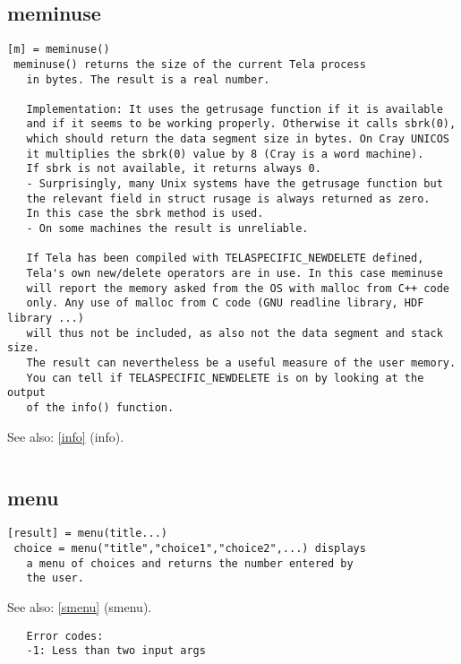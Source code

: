 \documentclass[a4paper]{article}
\begin{document}
\subsection{meminuse\label{meminuse}}

\begin{tscreen}
\begin{verbatim}
[m] = meminuse()
 meminuse() returns the size of the current Tela process
   in bytes. The result is a real number.

   Implementation: It uses the getrusage function if it is available
   and if it seems to be working properly. Otherwise it calls sbrk(0),
   which should return the data segment size in bytes. On Cray UNICOS
   it multiplies the sbrk(0) value by 8 (Cray is a word machine).
   If sbrk is not available, it returns always 0.
   - Surprisingly, many Unix systems have the getrusage function but
   the relevant field in struct rusage is always returned as zero.
   In this case the sbrk method is used.
   - On some machines the result is unreliable.

   If Tela has been compiled with TELASPECIFIC_NEWDELETE defined,
   Tela's own new/delete operators are in use. In this case meminuse
   will report the memory asked from the OS with malloc from C++ code
   only. Any use of malloc from C code (GNU readline library, HDF library ...)
   will thus not be included, as also not the data segment and stack size.
   The result can nevertheless be a useful measure of the user memory.
   You can tell if TELASPECIFIC_NEWDELETE is on by looking at the output
   of the info() function.
\end{verbatim}

See also: \ref{info} {(info)}.
\begin{verbatim}
\end{verbatim}
\end{tscreen}



\subsection{menu\label{menu}}

\begin{tscreen}
\begin{verbatim}
[result] = menu(title...)
 choice = menu("title","choice1","choice2",...) displays
   a menu of choices and returns the number entered by
   the user.
\end{verbatim}

See also: \ref{smenu} {(smenu)}.
\begin{verbatim}
   Error codes:
   -1: Less than two input args 
\end{verbatim}
\end{tscreen}
\end{document}

